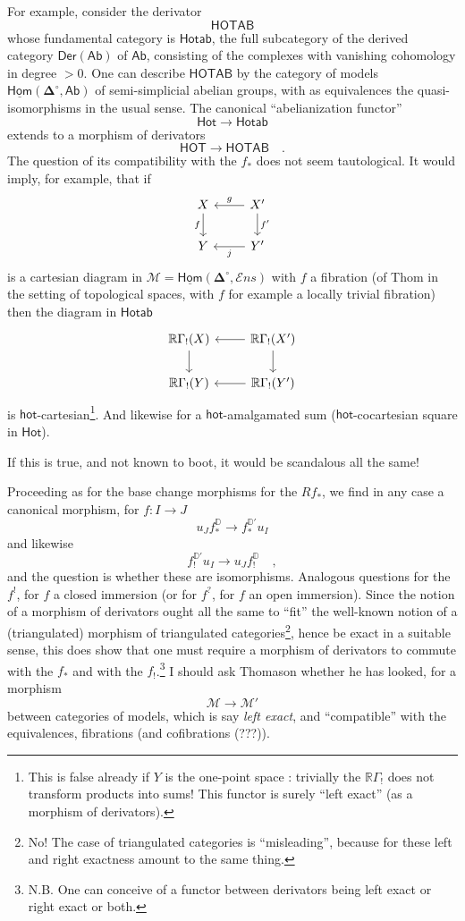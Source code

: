 \documentclass[11pt]{article}
\newcommand{\printedpage}[1]{\marginpar{\footnotesize p.~#1}}
\newcommand{\msp}[1]{\marginpar{\footnotesize [#1]}}
\newcommand{\DD}{\mathbb{D}}
\newcommand{\uHom}{\underline{\mathsf{Hom}}}
\newcommand{\Ens}{\mathcal{E}ns}
\newcommand{\bDelta}{\boldsymbol{\Delta}}
\begin{document}
\printedpage{12}
\noindent\msp{page 15}For example, consider the derivator
\[
\mathsf{HOTAB}
\]
whose fundamental category is $\mathsf{Hotab}$, the full subcategory of the derived category $\mathsf{Der}(\mathsf{Ab})$ of $\mathsf{Ab}$, consisting of the complexes with vanishing cohomology in degree $> 0$. One can describe $\mathsf{HOTAB}$ by the category of models $\uHom(\bDelta^\circ,\mathsf{Ab})$ of semi-simplicial abelian groups, with as equivalences the quasi-isomorphisms in the usual sense. The canonical ``abelianization functor''
\[
\mathsf{Hot} \longrightarrow \mathsf{Hotab}
\]
extends to a morphism of derivators
\[
\mathsf{HOT} \longrightarrow \mathsf{HOTAB} \quad .
\]
The question of its compatibility with the $f_*$ does not seem tautological. It would imply, for example, that if
\[
\begin{tikzcd}
X \arrow[d, "f"'] & X' \arrow[l, "g"'] \arrow[d, "f'"] \\
Y & Y' \arrow[l, "j"]
\end{tikzcd}
\]
is a cartesian diagram in $\mathcal{M} = \uHom(\bDelta^\circ,\Ens)$ with $f$ a fibration (of Thom in the setting of topological spaces, with $f$ for example a locally trivial fibration) then the diagram in $\mathsf{Hotab}$
\[
\begin{tikzcd}
\mathbb{R}\Gamma_!(X) \arrow[d] & \mathbb{R}\Gamma_!(X') \arrow[l] \arrow[d] \\
\mathbb{R}\Gamma_!(Y) & \mathbb{R}\Gamma_!(Y') \arrow[l]
\end{tikzcd}
\]
is $\mathsf{hot}$-cartesian\footnote[7]{This is false already if $Y$ is the one-point space : trivially the $\mathbb{R}\Gamma_!$ does not transform products into sums! This functor is surely ``left exact'' (as a morphism of derivators).}. And likewise for a $\mathsf{hot}$-amalgamated sum ($\mathsf{hot}$-cocartesian square in $\mathsf{Hot}$). %

\noindent\msp{page 16}If this is true, and not known to boot, it would be scandalous all the same!

Proceeding as for the base change morphisms for the $Rf_*$, we find in any case a canonical morphism, for $f : I \to J$
\[
u_Jf_*^{\DD} \longrightarrow f_*^{\DD'}u_I
\]
\printedpage{13}%
and likewise
\[
f_!^{\DD'}u_I \longrightarrow u_Jf_!^{\DD} \quad ,
\]
and the question is whether these are isomorphisms. Analogous questions for the $f^!$, for $f$ a closed immersion (or for $f^?$, for $f$ an open immersion). Since the notion of a morphism of derivators ought all the same to ``fit'' the well-known notion of a (triangulated) morphism of triangulated categories\footnote[8]{No! The case of triangulated categories is ``misleading'', because for these left and right exactness amount to the same thing.}, hence be exact in a suitable sense, this does show that one must require a morphism of derivators to commute with the $f_*$ and with the $f_!$.\footnote[9]{N.B. One can conceive of a functor between derivators being left exact or right exact or both.} I should ask Thomason whether he has looked, for a morphism
\[
\mathcal{M} \longrightarrow \mathcal{M}'
\]
between categories of models, which is say \textit{left exact}, and ``compatible'' with the equivalences, fibrations (and cofibrations (???)).
\end{document}
